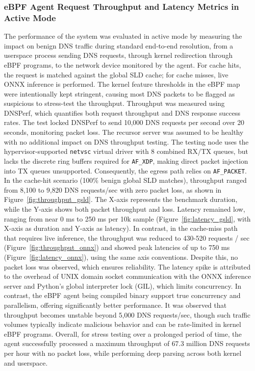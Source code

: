 \documentclass [11pt, proquest] {uwthesis}[2020/02/24]
\begin{document}
\subsubsection{eBPF Agent Request Throughput and Latency Metrics in Active Mode}
The performance of the system was evaluated in active mode by measuring the impact on benign DNS traffic during standard end-to-end resolution, from a userspace process sending DNS requests, through kernel redirection through eBPF programs, to the network device monitored by the agent. For cache hits, the request is matched against the global SLD cache; for cache misses, live ONNX inference is performed. The kernel feature thresholds in the eBPF map were intentionally kept stringent, causing most DNS packets to be flagged as suspicious to stress-test the throughput. Throughput was measured using DNSPerf, which quantifies both request throughput and DNS response success rates. The test locked DNSPerf to send 10,000 DNS requests per second over 20 seconds, monitoring packet loss. The recursor server was assumed to be healthy with no additional impact on DNS throughput testing. The testing node uses the hypervisor-supported \texttt{netvsc} virtual driver with 8 combined RX/TX queues, but lacks the discrete ring buffers required for \texttt{AF\_XDP}, making direct packet injection into TX queues unsupported. Consequently, the egress path relies on \texttt{AF\_PACKET}. In the cache-hit scenario (100\% benign global SLD matches), throughput ranged from 8,100 to 9,820 DNS requests/sec with zero packet loss, as shown in Figure~\ref{fig:throughput_gsld}. The X-axis represents the benchmark duration, while the Y-axis shows both packet throughput and loss. Latency remained low, ranging from near 0 ms to 250 ms per 10k sample (Figure~\ref{fig:latency_gsld}, with X-axis as duration and Y-axis as latency). In contrast, in the cache-miss path that requires live inference, the throughput was reduced to 430-520 requests / sec (Figure~\ref{fig:throughput_onnx}) and showed peak latencies of up to 750 ms (Figure~\ref{fig:latency_onnx}), using the same axis conventions. Despite this, no packet loss was observed, which ensures reliability. The latency spike is attributed to the overhead of UNIX domain socket communication with the ONNX inference server and Python's global interpreter lock (GIL), which limits concurrency. In contrast, the eBPF agent being compiled binary support true concurrency and parallelism, offering significantly better performance.
It was observed that throughput becomes unstable beyond 5,000 DNS requests/sec, though such traffic volumes typically indicate malicious behavior and can be rate-limited in kernel eBPF programs. Overall, for stress testing over a prolonged period of time, the agent successfully processed a maximum throughput of 67.3 million DNS requests per hour with no packet loss, while performing deep parsing across both kernel and userspace.
\end{document}
